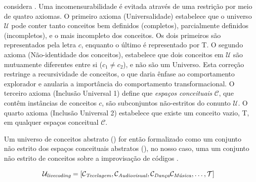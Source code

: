 \begin{citacao}
\end{citacao}

 considera  . Uma incomensurabilidade é evitada através de uma restrição por meio de quatro axiomas. O primeiro axioma (Universalidade) estabelece que o universo $\mathcal{U}$ pode conter tanto conceitos bem definidos (completos), parcialmente definidos (incompletos), e  o mais incompleto dos conceitos. Os dois primeiros são representados pela letra $c$, enquanto o último é representado por \small{T}. O segundo axioma (Não-identidade dos conceitos), estabelece que dois conceitos em  $\mathcal{U}$ são mutuamente diferentes entre si ($c_1 \neq c_2$), e não são um Universo. Esta correção restringe a recursividade de conceitos, o que daria ênfase ao comportamento explorador e anularia a importância do comportamento transformacional. O terceiro axioma (Inclusão Universal 1) define que \emph{espaços conceituais} $\mathcal{C}$, que contêm instâncias de conceitos $c$, são subconjuntos não-estritos do conunto $\mathcal{U}$. O quarto axioma (Inclusão Universal 2) estabelece que existe um conceito vazio, \small{T}, em qualquer espaços conceitual $\mathcal{C}$.


Um universo de conceitos abstrato () for então formalizado como um conjunto não estrito dos espaços conceituais abstratos (), no nosso caso, uma um conjunto não estrito de conceitos sobre a improvisação de códigos . 

\begin{equation}
\mathcal{U}_\emph{livecoding} = [\mathcal{C}_\emph{Tecelagem}, \mathcal{C}_\emph{Audiovisual}, \mathcal{C}_\emph{Dança} \mathcal{C}_\emph{Música}, \ldots, \mathcal{T}]
\end{equation}\label{eq:ul}

